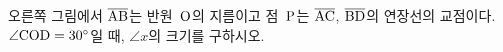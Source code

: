 \noindent\begin{minipage}[t]{0.58\linewidth}\vspace{0pt}\raggedright 오른쪽 그림에서 $\overline{\mathrm{AB}}$는 반원~$\mathrm{O}$의 지름이고 점~$\mathrm{P}$는 $\overline{\mathrm{AC}}$, $\overline{\mathrm{BD}}$의 연장선의 교점이다. $\angle\mathrm{COD}=30^\circ$일 때, $\angle x$의 크기를 구하시오.\end{minipage}\hfill\begin{minipage}[t]{0.4\linewidth}\vspace{0pt}\centering \resizebox{\ifdim\width>\linewidth\linewidth\else\width\fi}{!}{}\end{minipage}\par
